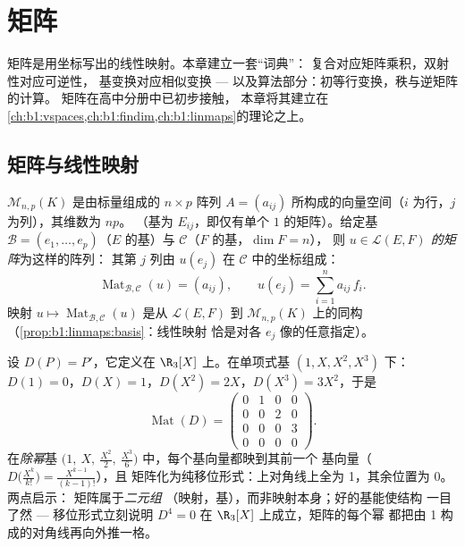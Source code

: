 \chapter{矩阵}\label{ch:b1:matrices}

矩阵是用坐标写出的线性映射。本章建立一套“词典”：
复合对应矩阵乘积，双射性对应可逆性，
基变换对应相似变换 ---
以及算法部分：初等行变换，秩与逆矩阵的计算。
矩阵在高中分册中已初步接触，
本章将其建立在
\cref{ch:b1:vspaces,ch:b1:findim,ch:b1:linmaps}的理论之上。

\section{矩阵与线性映射}

\begin{definition}\label{def:b1:matrices:def}
$\mathcal{M}_{n,p}(K)$ 是由标量组成的 $n \times p$ 阵列 $A
= (a_{ij})$ 所构成的向量空间（$i$ 为行，$j$ 为列），其维数为 $np$。
（基为 $E_{ij}$，即仅有单个 $1$ 的矩阵）。给定基
$\mathcal{B} = (e_1, \dots, e_p)$（$E$ 的基）与 $\mathcal{C}$（$F$ 的基，$\dim F = n$），
则 \emph{$u \in \mathcal{L}(E, F)$ 的矩阵}为这样的阵列：
其第 $j$ 列由 $u(e_j)$ 在
$\mathcal{C}$ 中的坐标组成：
\[
\operatorname{Mat}_{\mathcal{B},\mathcal{C}}(u) = (a_{ij}),
\qquad u(e_j) = \sum_{i=1}^{n} a_{ij}\, f_i .
\]
映射 $u \mapsto \operatorname{Mat}_{\mathcal{B},\mathcal{C}}(u)$
是从 $\mathcal{L}(E, F)$ 到
$\mathcal{M}_{n,p}(K)$ 上的同构（\cref{prop:b1:linmaps:basis}：线性映射
恰是对各 $e_j$ 像的任意指定）。
\end{definition}

\begin{example}[导数的矩阵表示]
\label{ex:b1:matrices:derivative}
设 $D(P) = P'$，它定义在 $\R_3[X]$ 上。在单项式基 $(1, X, X^2,
X^3)$ 下：$D(1) = 0$，$D(X) = 1$，$D(X^2) = 2X$，$D(X^3) = 3X^2$，于是
\[
\operatorname{Mat}(D) =
\begin{pmatrix}
0 & 1 & 0 & 0\\
0 & 0 & 2 & 0\\
0 & 0 & 0 & 3\\
0 & 0 & 0 & 0
\end{pmatrix}.
\]
在\emph{除幂}基 $\bigl(1,\ X,\ \frac{X^2}2,\
\frac{X^3}6\bigr)$ 中，每个基向量都映到其前一个
基向量（$D\bigl(\frac{X^k}{k!}\bigr) = \frac{X^{k-1}}{(k-1)!}$），且
矩阵化为纯移位形式：上对角线上全为 1，其余位置为 0。两点启示：
矩阵属于\emph{二元组}
（映射，基），而非映射本身；好的基能使结构
一目了然 --- 移位形式立刻说明
$D^4 = 0$ 在 $\R_3[X]$ 上成立，矩阵的每个幂
都把由 1 构成的对角线再向外推一格。
\end{example}

